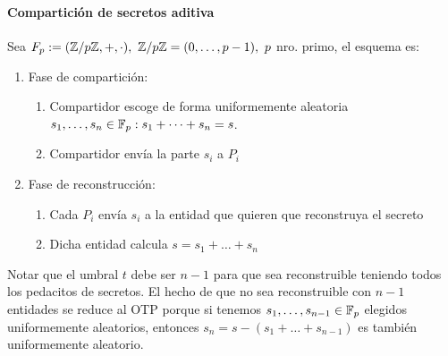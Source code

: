   \paragraph{Compartición de secretos aditiva}
  Sea $F_p := (\mathbb{Z}/p\mathbb{Z}, +, \cdot),\ \mathbb{Z}/p\mathbb{Z} = (0,\dots,p-1),\ p$ nro. primo, el esquema es:
  \begin{enumerate}
    \item Fase de compartición:
      \begin{enumerate}
        \item Compartidor escoge de forma uniformemente aleatoria $s_1,\dots,s_n\in\mathbb{F}_p : s_1+\dots+s_n=s$.
        \item Compartidor envía la parte $s_i$ a $P_i$
      \end{enumerate}
    \item Fase de reconstrucción:
      \begin{enumerate}
        \item Cada $P_i$ envía $s_i$ a la entidad que quieren que reconstruya el secreto 
        \item Dicha entidad calcula $s=s_1+\dots+s_n$
      \end{enumerate}
  \end{enumerate}
  \begin{remark}
    Notar que el umbral $t$ debe ser $n-1$ para que sea reconstruible teniendo todos los 
    pedacitos de secretos.
    El hecho de que no sea reconstruible con $n-1$ entidades se reduce al OTP porque si 
    tenemos $s_1,\dots,s_{n-1}\in\mathbb{F}_p$ elegidos uniformemente aleatorios, entonces 
    $s_n = s - (s_1+\dots+s_{n-1})$ es también uniformemente aleatorio.
  \end{remark}

